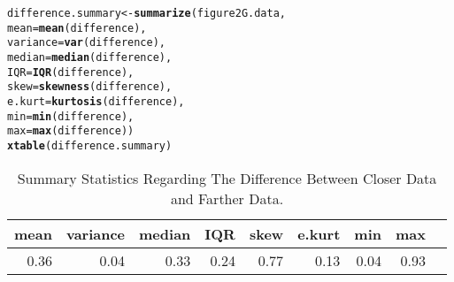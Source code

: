 \documentclass{article}\usepackage[]{graphicx}\usepackage[]{xcolor}
\makeatletter
\newcommand{\hldef}[1]{\textcolor[rgb]{0.345,0.345,0.345}{#1}}%
\newcommand{\hlkwb}[1]{\textcolor[rgb]{0.69,0.353,0.396}{#1}}%
\newcommand{\hlkwc}[1]{\textcolor[rgb]{0.333,0.667,0.333}{#1}}%
\newcommand{\hlkwd}[1]{\textcolor[rgb]{0.737,0.353,0.396}{\textbf{#1}}}%
\newenvironment{kframe}{%
 \def\at@end@of@kframe{}%
 \ifinner\ifhmode%
  \def\at@end@of@kframe{\end{minipage}}%
  \begin{minipage}{\columnwidth}%
 \fi\fi%
 \def\FrameCommand##1{\hskip\@totalleftmargin \hskip-\fboxsep
 \colorbox{shadecolor}{##1}\hskip-\fboxsep
     \hskip-\linewidth \hskip-\@totalleftmargin \hskip\columnwidth}%
 \MakeFramed {\advance\hsize-\width
   \@totalleftmargin\z@ \linewidth\hsize
   \@setminipage}}%
 {\par\unskip\endMakeFramed%
 \at@end@of@kframe}
\newenvironment{knitrout}{}{} %
\makeatother
\begin{document}
\begin{enumerate}
\begin{enumerate}
\begin{knitrout}
\color{fgcolor}\begin{kframe}
\begin{alltt}
\hldef{difference.summary} \hlkwb{<-} \hlkwd{summarize}\hldef{(figure2G.data,}
                            \hlkwc{mean} \hldef{=} \hlkwd{mean}\hldef{(difference),}
                            \hlkwc{variance} \hldef{=} \hlkwd{var}\hldef{(difference),}
                            \hlkwc{median} \hldef{=} \hlkwd{median}\hldef{(difference),}
                            \hlkwc{IQR} \hldef{=} \hlkwd{IQR}\hldef{(difference),}
                            \hlkwc{skew} \hldef{=} \hlkwd{skewness}\hldef{(difference),}
                            \hlkwc{e.kurt} \hldef{=} \hlkwd{kurtosis}\hldef{(difference),}
                            \hlkwc{min} \hldef{=} \hlkwd{min}\hldef{(difference),}
                            \hlkwc{max} \hldef{=} \hlkwd{max}\hldef{(difference))}
\hlkwd{xtable}\hldef{(difference.summary)}
\end{alltt}
\end{kframe}
\end{knitrout}

\begin{table}[ht]
\centering
\begin{tabular}{rrrrrrrrr}
  \hline
mean & variance & median & IQR & skew & e.kurt & min & max \\ 
  \hline
0.36 & 0.04 & 0.33 & 0.24 & 0.77 & 0.13 & 0.04 & 0.93 \\ 
   \hline
\end{tabular}
\caption{Summary Statistics Regarding The Difference Between Closer Data and Farther Data.}
\label{table4}
\end{table}


\end{enumerate}
\end{enumerate}
\end{document}
